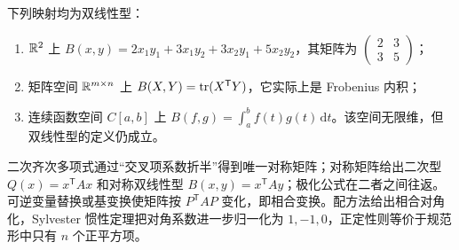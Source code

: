 \begin{example}[title={三个典型双线性型}]
下列映射均为双线性型：
\begin{enumerate}
\item $\mathbb{R}^2$ 上 $B(x,y)=2x_1y_1+3x_1y_2+3x_2y_1+5x_2y_2$，其矩阵为 $\begin{pmatrix}2&3\\3&5\end{pmatrix}$；
\item 矩阵空间 $\mathbb{R}^{m\times n}$ 上 $B(X,Y)=\operatorname{tr}(X^{\mathsf T}Y)$，它实际上是 Frobenius 内积；
\item 连续函数空间 $C[a,b]$ 上 $B(f,g)=\int_a^b f(t)g(t)\,\mathrm dt$。该空间无限维，但双线性型的定义仍成立。
\end{enumerate}
\end{example}

\begin{summary}[本章知识链]
二次齐次多项式通过“交叉项系数折半”得到唯一对称矩阵；对称矩阵给出二次型 $Q(x)=x^{\mathsf T}Ax$ 和对称双线性型 $B(x,y)=x^{\mathsf T}Ay$；极化公式在二者之间往返。可逆变量替换或基变换使矩阵按 $P^{\mathsf T}AP$ 变化，即相合变换。配方法给出相合对角化，Sylvester 惯性定理把对角系数进一步归一化为 $1,-1,0$，正定性则等价于规范形中只有 $n$ 个正平方项。
\end{summary}
